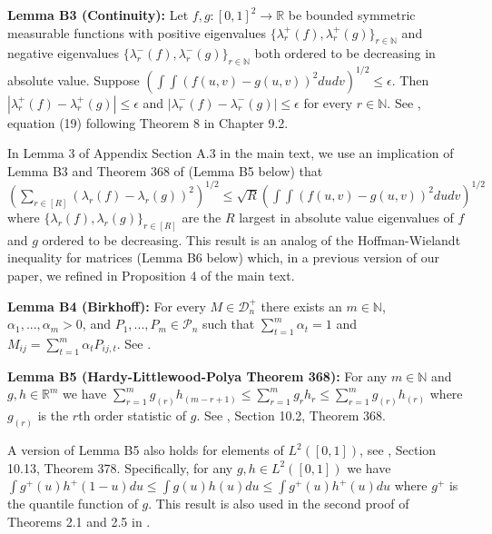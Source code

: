 \documentclass[12pt]{article}
\theoremstyle{definition}
\begin{document}
\begin{flushleft}
\textbf{Lemma B3 (Continuity):} Let $f,g :[0,1]^{2}\to \mathbb{R}$ be bounded symmetric measurable functions with positive eigenvalues $\{\lambda^{+}_{r}(f),\lambda^{+}_{r}(g)\}_{r \in \mathbb{N}}$ and negative eigenvalues $\{\lambda^{-}_{r}(f),\lambda^{-}_{r}(g)\}_{r \in \mathbb{N}}$ both ordered to be decreasing in absolute value. Suppose $\left(\int\int \left(f(u,v)-g(u,v)\right)^{2}dudv\right)^{1/2} \leq \epsilon$. Then $|\lambda^{+}_{r}(f)-\lambda^{+}_{r}(g)| \leq \epsilon$ and $|\lambda_{r}^{-}(f)-\lambda_{r}^{-}(g)| \leq \epsilon$ for every ${r \in \mathbb{N}}$. See \cite{birman2012spectral}, equation (19) following Theorem 8 in Chapter 9.2.     
\end{flushleft}

In Lemma 3 of Appendix Section A.3 in the main text, we use an implication of Lemma B3 and Theorem 368 of \cite{hardy1952inequalities} (Lemma B5 below) that $\left(\sum_{r \in [R]}\left(\lambda_{r}(f)-\lambda_{r}(g)\right)^{2}\right)^{1/2} \leq \sqrt{R}\left(\int\int \left(f(u,v)-g(u,v)\right)^{2}dudv\right)^{1/2}$ where $\{\lambda_{r}(f),\lambda_{r}(g)\}_{r \in [R]}$ are the $R$ largest in absolute value eigenvalues of $f$ and $g$ ordered to be decreasing. This result is an analog of the Hoffman-Wielandt inequality for matrices (Lemma B6 below) which, in a previous version of our paper, we refined in Proposition 4 of the main text.   



\begin{flushleft}
\textbf{Lemma B4 (Birkhoff):} For every $M \in \mathcal{D}^{+}_{n}$ there exists an $m \in \mathbb{N}$, $\alpha_{1},...,\alpha_{m} > 0$, and $P_{1},...,P_{m} \in \mathcal{P}_{n}$ such that $\sum_{t=1}^{m}\alpha_{t} = 1$ and $M_{ij} = \sum_{t=1}^{m}\alpha_{t}P_{ij,t}$. See \cite{birkhoff1946three}.     
\end{flushleft}

\begin{flushleft}
\textbf{Lemma B5 (Hardy-Littlewood-Polya Theorem 368):} For any $m\in \mathbb{N}$ and $g,h \in \mathbb{R}^{m}$ we have $\sum_{r=1}^{m} g_{(r)}h_{(m-r+1)} \leq  \sum_{r=1}^{m} g_{r}h_{r}  \leq  \sum_{r=1}^{m} g_{(r)}h_{(r)}$ where $g_{(r)}$ is the $r$th order statistic of $g$. See \cite{hardy1952inequalities}, Section 10.2, Theorem 368.    
\end{flushleft}

A version of Lemma B5 also holds for elements of $L^{2}([0,1])$, see  \cite{hardy1952inequalities}, Section 10.13, Theorem 378. Specifically, for any $g,h \in L^{2}([0,1])$ we have $\int g^{+}(u)h^{+}(1-u)du \leq \int g(u)h(u)du \leq \int g^{+}(u)h^{+}(u)du$ where $g^+$ is the quantile function of $g$. This result is also used in the second proof of Theorems 2.1 and 2.5 in \cite{whitt1976bivariate}.     
\end{document}
